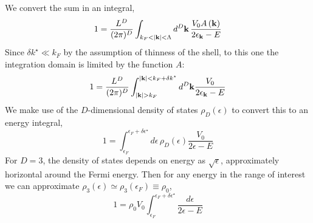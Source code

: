 We convert the sum in an integral,
\[
	1 = \frac{L^D}{(2\pi)^D} \int_{k_F<\abs{\mathbf{k}}<\Lambda} d^D \mathbf{k} \, \frac{V_0 A\left({\mathbf{k}}\right)}{2 \epsilon_\mathbf{k} - E}
\]
Since $\delta k^\star \ll k_F$ by the assumption of thinness of the shell, to this one the integration domain is limited by the function $A$:
\[
	1 = \frac{L^D}{(2\pi)^D} \int_{\abs{\mathbf{k}} > k_F}^{\abs{\mathbf{k}} < k_F+\delta k^\star} d^D \mathbf{k} \frac{V_0}{2 \epsilon_\mathbf{k} - E}
\]
We make use of the $D$-dimensional density of states $\rho_D(\epsilon)$ to convert this to an energy integral,
\[
	1 = \int_{\epsilon_F}^{\epsilon_F+\delta\epsilon^\star} d\epsilon \, \rho_D(\epsilon) \frac{V_0}{2 \epsilon - E}
\]
For $D=3$, the density of states depends on energy as $\sqrt{\epsilon}$, approximately horizontal around the Fermi energy. Then for any energy in the range of interest we can approximate $\rho_3 (\epsilon) \simeq \rho_3 (\epsilon_F) \equiv \rho_0$,
\[
	1 = \rho_0 V_0 \int_{\epsilon_F}^{\epsilon_F+\delta\epsilon^\star} \frac{d\epsilon}{2 \epsilon - E}
\]

